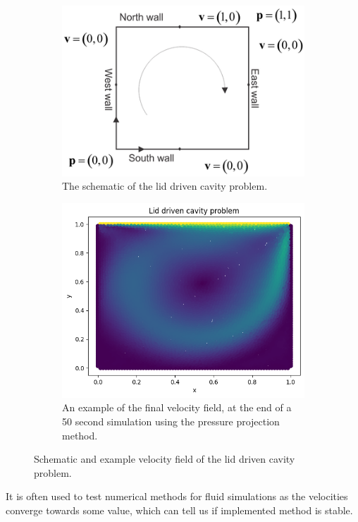 \documentclass{article}
\begin{document}
\begin{figure}[h!] 
    \centering
    \begin{subfigure}[t]{0.4\textwidth}
    \centering 
    \includegraphics[width=1\textwidth]{plots/lid_driven_cavity.png} 
    \caption{The schematic of the lid driven cavity problem.} 
    \end{subfigure}
    \begin{subfigure}[t]{0.4\textwidth}
    \centering 
    \includegraphics[width=1\textwidth]{plots/lidDriven_problem.png} 
    \caption{An example of the final velocity field, at the end of a 50 second simulation 
    using the pressure projection method.} 
    \end{subfigure}
    \caption{Schematic and example velocity field of the lid driven cavity problem.}
    \label{fig:lid_driven_cavity} 
\end{figure}
It is often used to test numerical methods for fluid simulations as the velocities converge towards 
some value, which can tell us if implemented method is stable.
\end{document}
